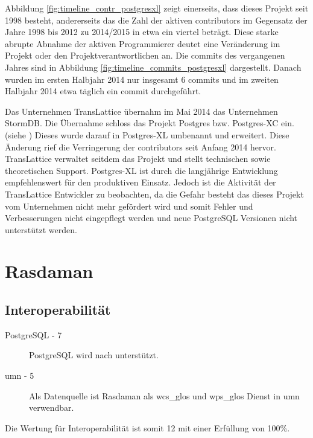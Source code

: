 Abbildung \ref{fig:timeline_contr_postgresxl} zeigt einerseits, dass dieses Projekt seit 1998 besteht, andererseits das die Zahl der aktiven contributors im Gegensatz der Jahre 1998 bis 2012 zu 2014/2015 in etwa ein viertel beträgt.
Diese starke abrupte Abnahme der aktiven Programmierer deutet eine Veränderung im Projekt oder den Projektverantwortlichen an.
Die commits des vergangenen Jahres sind in Abbildung \ref{fig:timeline_commits_postgresxl} dargestellt.
Danach wurden im ersten Halbjahr 2014 nur insgesamt 6 commits und im zweiten Halbjahr 2014 etwa täglich ein commit durchgeführt.

Das Unternehmen TransLattice übernahm im Mai 2014 das Unternehmen StormDB.
Die Übernahme schloss das Projekt Postgres bzw. Postgres-XC ein. (siehe \cite{website:translattice-stormdb})
Dieses wurde darauf in Postgres-XL umbenannt und erweitert.
Diese Änderung rief die Verringerung der contributors seit Anfang 2014 hervor.
TransLattice verwaltet seitdem das Projekt und stellt technischen sowie theoretischen Support.
Postgres-XL ist durch die langjährige Entwicklung empfehlenswert für den produktiven Einsatz.
Jedoch ist die Aktivität der TransLattice Entwickler zu beobachten, da die Gefahr besteht das dieses Projekt vom Unternehmen nicht mehr gefördert wird und somit Fehler und Verbesserungen nicht eingepflegt werden und neue PostgreSQL Versionen nicht unterstützt werden.


\section{Rasdaman}

\subsection{Interoperabilität}
\begin{description}
\item[PostgreSQL - 7] PostgreSQL wird nach \cite{website:rasdaman-features} unterstützt.
\item[\Gls{umn} - 5] Als Datenquelle ist Rasdaman als \Gls{wcs_glos} und \Gls{wps_glos} Dienst in \Gls{umn} verwendbar.
\end{description}
Die Wertung für Interoperabilität ist somit 12 mit einer Erfüllung von 100\%.

